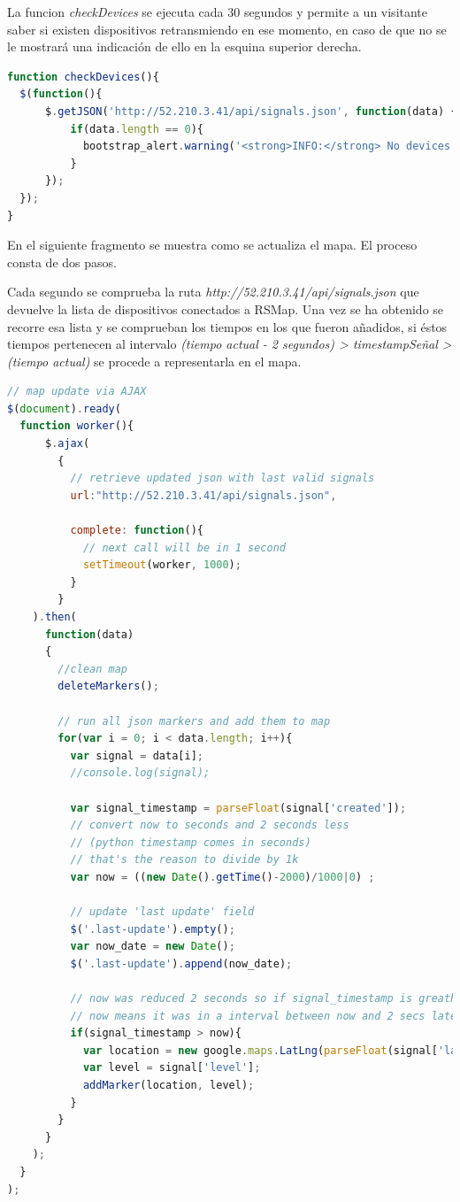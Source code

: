 La funcion \textit{checkDevices} se ejecuta cada 30 segundos y permite a un visitante saber si existen dispositivos retransmiendo en ese momento, en caso de que no se le mostrará una indicación de ello en la esquina superior derecha.

\newpage

\begin{lstlisting}[language=javascript,caption={Función checkDevices},label={lst:pi1}]
function checkDevices(){
  $(function(){
      $.getJSON('http://52.210.3.41/api/signals.json', function(data) {
          if(data.length == 0){
            bootstrap_alert.warning('<strong>INFO:</strong> No devices sending data right now', 'warning', 4000);
          }
      });
  });
}
\end{lstlisting}

En el siguiente fragmento se muestra como se actualiza el mapa. El proceso consta de dos pasos.

Cada segundo se comprueba la ruta \textit{http://52.210.3.41/api/signals.json} que devuelve la lista de dispositivos conectados a RSMap. Una vez se ha obtenido se recorre esa lista y se comprueban los tiempos en los que fueron añadidos, si éstos tiempos pertenecen al intervalo \textit{(tiempo actual - 2 segundos) > timestampSeñal > (tiempo actual)} se procede a representarla en el mapa.

\begin{lstlisting}[language=javascript,caption={Actualización dinámica del mapa},label={lst:pi1}]
// map update via AJAX
$(document).ready(
  function worker(){
	  $.ajax(
	    {
	      // retrieve updated json with last valid signals
	      url:"http://52.210.3.41/api/signals.json",

	      complete: function(){
	        // next call will be in 1 second
	        setTimeout(worker, 1000);
	      }
	    }
    ).then(
      function(data)
      {
        //clean map
        deleteMarkers();

        // run all json markers and add them to map
        for(var i = 0; i < data.length; i++){
          var signal = data[i];
          //console.log(signal);

          var signal_timestamp = parseFloat(signal['created']);
          // convert now to seconds and 2 seconds less
          // (python timestamp comes in seconds)
          // that's the reason to divide by 1k
          var now = ((new Date().getTime()-2000)/1000|0) ;

          // update 'last update' field
          $('.last-update').empty();
          var now_date = new Date();
          $('.last-update').append(now_date);

          // now was reduced 2 seconds so if signal_timestamp is greather than
          // now means it was in a interval between now and 2 secs later
          if(signal_timestamp > now){
            var location = new google.maps.LatLng(parseFloat(signal['lat']), parseFloat(signal['long']));
            var level = signal['level'];
            addMarker(location, level);
          }
        }
      }
    );
  }
);
\end{lstlisting}

